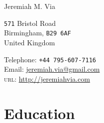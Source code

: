 \documentclass[10pt, a4paper]{article}
\begin{document}
{\LARGE Jeremiah M. Via}\\[1cm]
\begin{minipage}[t]{0.55\textwidth}
  \texttt{571} Bristol Road\\
  Birmingham, \texttt{B29 6AF}\\
  United Kingdom
\end{minipage}
\begin{minipage}[t]{0.4\textwidth}
  Telephone: \texttt{+44 795-607-7116}\\
  Email: \href{mailto:jeremiah.via@gmail.com}{jeremiah.via@gmail.com}\\
  \textsc{url}: \href{http://jeremiahvia.com}{http://jeremiahvia.com}
\end{minipage}



\section*{Education}
\end{document}
